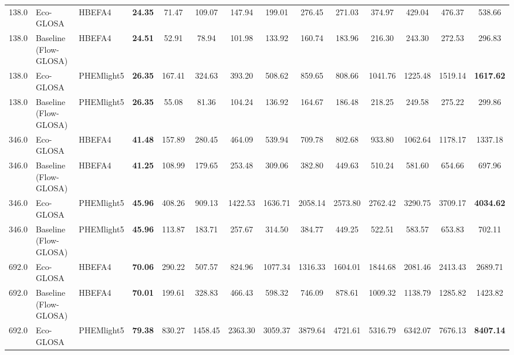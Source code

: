 \begin{table}[htb]
{\begin{tabular}{l l l *{11}{c}}
      \midrule
      138.0 & Eco-GLOSA                  & HBEFA4       & \textbf{24.35}      & 71.47      & 109.07     & 147.94     & 199.01     & 276.45     & 271.03     & 374.97     & 429.04     & 476.37     & 538.66     \\
      138.0 & Baseline (Flow-GLOSA)      & HBEFA4       & \textbf{24.51}      & 52.91 & 78.94      & 101.98     & 133.92     & 160.74     & 183.96     & 216.30     & 243.30     & 272.53     & 296.83     \\
      138.0 & Eco-GLOSA                  & PHEMlight5   & \textbf{26.35}      & 167.41     & 324.63     & 393.20     & 508.62     & 859.65     & 808.66     & 1041.76    & 1225.48    & 1519.14    & \textbf{1617.62} \\
      138.0 & Baseline (Flow-GLOSA)      & PHEMlight5   & \textbf{26.35}      & 55.08      & 81.36      & 104.24     & 136.92     & 164.67     & 186.48     & 218.25     & 249.58     & 275.22     & 299.86     \\
      \midrule
      346.0 & Eco-GLOSA                  & HBEFA4       & \textbf{41.48}      & 157.89     & 280.45     & 464.09     & 539.94     & 709.78     & 802.68     & 933.80     & 1062.64    & 1178.17    & 1337.18    \\
      346.0 & Baseline (Flow-GLOSA)      & HBEFA4       & \textbf{41.25}      & 108.99 & 179.65     & 253.48     & 309.06     & 382.80     & 449.63     & 510.24     & 581.60     & 654.66     & 697.96     \\
      346.0 & Eco-GLOSA                  & PHEMlight5   & \textbf{45.96}      & 408.26     & 909.13     & 1422.53    & 1636.71    & 2058.14    & 2573.80    & 2762.42    & 3290.75    & 3709.17    & \textbf{4034.62} \\
      346.0 & Baseline (Flow-GLOSA)      & PHEMlight5   & \textbf{45.96}      & 113.87     & 183.71     & 257.67     & 314.50     & 384.77     & 449.25     & 522.51     & 583.57     & 653.83     & 702.11     \\
      \midrule
      692.0 & Eco-GLOSA                  & HBEFA4       & \textbf{70.06}      & 290.22     & 507.57     & 824.96     & 1077.34    & 1316.33    & 1604.01    & 1844.68    & 2081.46    & 2413.43    & 2689.71    \\
      692.0 & Baseline (Flow-GLOSA)      & HBEFA4       & \textbf{70.01}      & 199.61 & 328.83     & 466.43     & 598.32     & 746.09     & 878.61     & 1009.32    & 1138.79    & 1285.82    & 1423.82    \\
      692.0 & Eco-GLOSA                  & PHEMlight5   & \textbf{79.38}      & 830.27     & 1458.45    & 2363.30    & 3059.37    & 3879.64    & 4721.61    & 5316.79    & 6342.07    & 7676.13    & \textbf{8407.14} \\

\end{tabular}}
\end{table}
